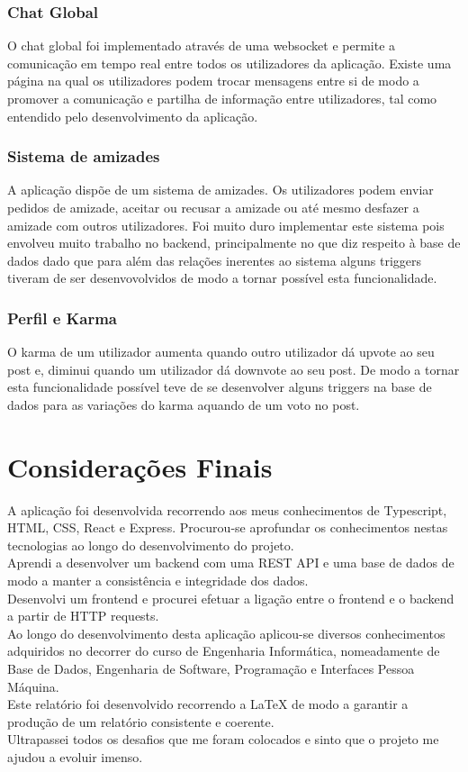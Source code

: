 \documentclass{article}
\begin{document}
	\subsubsection{Chat Global}
	O chat global foi implementado através de uma websocket e permite a comunicação em tempo real entre todos os utilizadores da aplicação. Existe uma página na qual os utilizadores podem trocar mensagens entre si de modo a promover a comunicação e partilha de informação entre utilizadores, tal como entendido pelo desenvolvimento da aplicação.
	\subsubsection{Sistema de amizades}
	A aplicação dispõe de um sistema de amizades. Os utilizadores podem enviar pedidos de amizade, aceitar ou recusar a amizade ou até mesmo desfazer a amizade com outros utilizadores. Foi muito duro implementar este sistema pois envolveu muito trabalho no backend, principalmente no que diz respeito à base de dados dado que para além das relações inerentes ao sistema alguns triggers tiveram de ser desenvovolvidos de modo a tornar possível esta funcionalidade.
	\subsubsection{Perfil e Karma}
	O karma de um utilizador aumenta quando outro utilizador dá upvote ao seu post e, diminui quando um utilizador dá downvote ao seu post. De modo a tornar esta funcionalidade possível teve de se desenvolver alguns triggers na base de dados para as variações do karma aquando de um voto no post.
	\section{Considerações Finais}
	A aplicação foi desenvolvida recorrendo aos meus conhecimentos de Typescript, HTML, CSS, React e Express. Procurou-se aprofundar os conhecimentos nestas tecnologias ao longo do desenvolvimento do projeto.\\Aprendi a desenvolver um backend com uma REST API e uma base de dados de modo a manter a consistência e integridade dos dados.\\Desenvolvi um frontend e procurei efetuar a ligação entre o frontend e o backend a partir de HTTP requests.\\
	Ao longo do desenvolvimento desta aplicação aplicou-se diversos conhecimentos adquiridos no decorrer do curso de Engenharia Informática, nomeadamente de Base de Dados, Engenharia de Software, Programação e Interfaces Pessoa Máquina.\\
	Este relatório foi desenvolvido recorrendo a LaTeX de modo a garantir a produção de um relatório consistente e coerente.\\
	Ultrapassei todos os desafios que me foram colocados e sinto que o projeto me ajudou a evoluir imenso.\\
\end{document}
